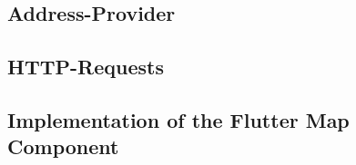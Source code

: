 \subsection{Address-Provider}

\subsection{HTTP-Requests}

\subsection{Implementation of the Flutter Map Component}

\newpage